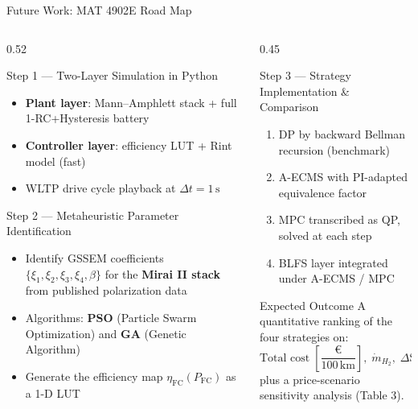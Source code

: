 \documentclass[aspectratio=169, 10pt]{beamer}
\newcommand{\SoC}{\mathrm{SoC}}
\newcommand{\etaFC}{\eta_{\mathrm{FC}}}
\newcommand{\highlight}[1]{\textcolor{fcgold!80!black}{\textbf{#1}}}
\begin{document}
\begin{frame}{Future Work: MAT 4902E Road Map}
  \begin{columns}[T]
    \begin{column}{0.52\textwidth}
      \begin{block}{\; Step 1 — Two-Layer Simulation in Python}
        \begin{itemize}
          \item \textbf{Plant layer}: Mann–Amphlett stack + full 1-RC+Hysteresis battery
          \item \textbf{Controller layer}: efficiency LUT + Rint model (fast)
          \item WLTP drive cycle playback at $\Delta t = 1\,\text{s}$
        \end{itemize}
      \end{block}
      \vspace{6pt}
      \begin{block}{\; Step 2 — Metaheuristic Parameter Identification}
        \begin{itemize}
          \item Identify GSSEM coefficients $\{\xi_1,\xi_2,\xi_3,\xi_4,\beta\}$ for the \textbf{Mirai II stack} from published polarization data
          \item Algorithms: \highlight{PSO} (Particle Swarm Optimization) and \highlight{GA} (Genetic Algorithm)
          \item Generate the efficiency map $\etaFC(P_{\mathrm{FC}})$ as a 1-D LUT
        \end{itemize}
      \end{block}
    \end{column}
    \begin{column}{0.45\textwidth}
      \begin{block}{\; Step 3 — Strategy Implementation \& Comparison}
        \begin{enumerate}
          \item DP by backward Bellman recursion (benchmark)
          \item A-ECMS with PI-adapted equivalence factor
          \item MPC transcribed as QP, solved at each step
          \item BLFS layer integrated under A-ECMS / MPC
        \end{enumerate}
      \end{block}
      \vspace{4pt}
      \begin{alertblock}{\; Expected Outcome}
        A quantitative ranking of the four strategies on:
        \[
          \text{Total cost} \;\left[\frac{\text{€}}{100\,\text{km}}\right],\;
          \dot{m}_{H_2},\; \Delta\SoC_{\mathrm{terminal}}
        \]
        plus a price-scenario sensitivity analysis (Table 3).
      \end{alertblock}
    \end{column}
  \end{columns}
\end{frame}
\end{document}
